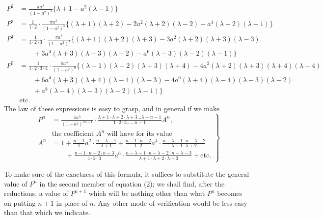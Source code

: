 \documentclass{article}
\begin{document}
\[ \begin{aligned} P^{2}&=\frac{\pi a^{\lambda}}{(1-a^{2})^{3}}\{\lambda+1-a^{2}(\lambda-1)\}\\ P^{3}&=\frac{1}{1\cdot2}\cdot\frac{\pi a^{\lambda}}{(1-a^{2})^{5}}\{(\lambda+1)(\lambda+2)-2a^{2}(\lambda+2)(\lambda-2)+a^{4}(\lambda-2)(\lambda-1)\}\\ P^{4}&=\frac{1}{1\cdot2\cdot3}\cdot\frac{\pi a^{\lambda}}{(1-a^{2})^{7}}\{(\lambda+1)(\lambda+2)(\lambda+3)-3a^{2}(\lambda+2)(\lambda+3)(\lambda-3)\\ &\qquad+3a^{4}(\lambda+3)(\lambda-3)(\lambda-2)-a^{6}(\lambda-3)(\lambda-2)(\lambda-1)\}\\ P^{5}&=\frac{1}{1\cdot2\cdot3\cdot4}\cdot\frac{\pi a^{\lambda}}{(1-a^{2})^{9}}\{(\lambda+1)(\lambda+2)(\lambda+3)(\lambda+4)-4a^{2}(\lambda+2)(\lambda+3)(\lambda+4)(\lambda-4)\\ &\qquad+6a^{4}(\lambda+3)(\lambda+4)(\lambda-4)(\lambda-3)-4a^{6}(\lambda+4)(\lambda-4)(\lambda-3)(\lambda-2)\\ &\qquad+a^{8}(\lambda-4)(\lambda-3)(\lambda-2)(\lambda-1)\}\\ &\text{etc.} \end{aligned} \]
The law of these expressions is easy to grasp, and in general if we make
\[ \left.\begin{aligned} P^{n}&=\frac{\pi a^{\lambda}}{(1-a^{2})^{2n-1}}\cdot\frac{\lambda+1\cdot\lambda+2\cdot\lambda+3\ldots\lambda+n-1}{1\cdot2\cdot3\ldots\ldots n-1}A^{n},\\ &\text{the coefficient }A^{n}\text{ will have for its value}\\ A^{n}&=1+\frac{n-1}{1}a^{2}\cdot\frac{n-\lambda-1}{\lambda+1}+\frac{n-1\cdot n-2}{1\cdot2}a^{4}\cdot\frac{n-\lambda-1\cdot n-\lambda-2}{\lambda+1\cdot\lambda+2}\\ &\qquad+\frac{n-1\cdot n-2\cdot n-3}{1\cdot2\cdot3}a^{6}\cdot\frac{n-\lambda-1\cdot n-\lambda-2\cdot n-\lambda-3}{\lambda+1\cdot\lambda+2\cdot\lambda+3}+\text{etc.} \end{aligned}\right\} \tag{3} \]

To make sure of the exactness of this formula, it suffices to substitute the general value of $P^{n}$ in the second member of equation (2); we shall find, after the reductions, a value of $P^{n+1}$ which will be nothing other than what $P^{n}$ becomes on putting $n+1$ in place of $n$. Any other mode of verification would be less easy than that which we indicate.
\end{document}
